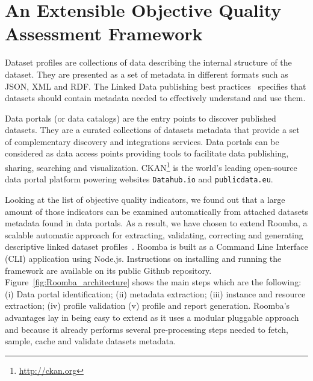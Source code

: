 \documentclass[onecolumn, crcready]{../../Util/LaTEX/iosart2c}
\begin{document}

\section{An Extensible Objective Quality Assessment Framework}
\label{sec:quality-assessment-framework}

Dataset profiles are collections of data describing the internal structure of the dataset. They are presented as a set of metadata in different formats such as JSON, XML and RDF. The Linked Data publishing best practices~\cite{Bizer:DB:11} specifies that datasets should contain metadata needed to effectively understand and use them.

Data portals (or data catalogs) are the entry points to discover published datasets. They are a curated collections of datasets metadata that provide a set of complementary discovery and integrations services. Data portals can be considered as data access points providing tools to facilitate data publishing, sharing, searching and visualization. CKAN\footnote{\url{http://ckan.org}} is the world's leading open-source data portal platform powering websites \texttt{Datahub.io} and \texttt{publicdata.eu}.

Looking at the list of objective quality indicators, we found out that a large amount of those indicators can be examined automatically from attached datasets metadata found in data portals. As a result, we have chosen to extend Roomba, a scalable automatic approach for extracting, validating, correcting and generating descriptive linked dataset profiles~\cite{Assaf:ESWC:PROFILES:15}. Roomba is built as a Command Line Interface (CLI) application using Node.js. Instructions on installing and running the framework are available on its public Github repository. Figure~\ref{fig:Roomba_architecture} shows the main steps which are the following: (i) Data portal identification; (ii) metadata extraction; (iii) instance and resource extraction; (iv) profile validation (v) profile and report generation. Roomba's advantages lay in being easy to extend as it uses a modular pluggable approach and because it already performs several pre-processing steps needed to fetch, sample, cache and validate datasets metadata.
\end{document}
